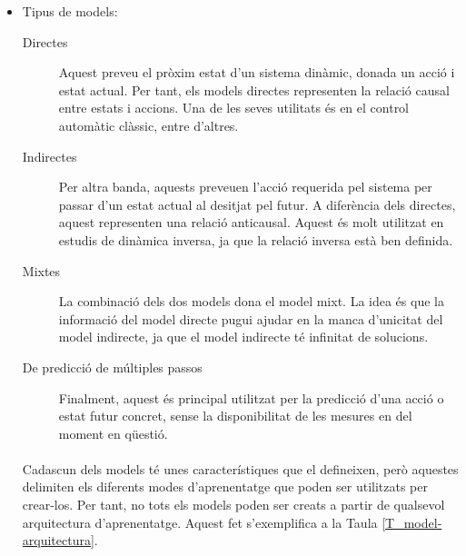 \documentclass[12pt,a4paper,final,twoside]{article}
\begin{document}
\begin{itemize}
\item Tipus de models:

\begin{description}

\item[Directes] Aquest preveu el pròxim estat d'un sistema dinàmic, donada un acció i estat actual. Per tant, els models directes representen la relació causal entre estats i accions. Una de les seves utilitats és en el control automàtic clàssic, entre d'altres.

\item[Indirectes] Per altra banda, aquests preveuen l'acció requerida pel sistema per passar d'un estat actual al desitjat pel futur. A diferència dels directes, aquest representen una relació anticausal. Aquest és molt utilitzat en estudis de dinàmica inversa, ja que la relació inversa està ben definida.

\item[Mixtes] La combinació dels dos models dona el model mixt. La idea és que la informació del model directe pugui ajudar en la manca d'unicitat del model indirecte, ja que el model indirecte té infinitat de solucions. 

\item[De predicció de múltiples passos] Finalment, aquest és principal utilitzat per la predicció d'una acció o estat futur concret, sense la disponibilitat de les mesures en del moment en qüestió.

\end{description}

\paragraph{}Cadascun dels models té unes característiques que el defineixen, però aquestes delimiten els diferents modes d'aprenentatge que poden ser utilitzats per crear-los. Per tant, no tots els models poden ser creats a partir de qualsevol arquitectura d'aprenentatge. Aquest fet s'exemplifica a la Taula \ref{T_model-arquitectura}.

\end{itemize}
\end{document}
